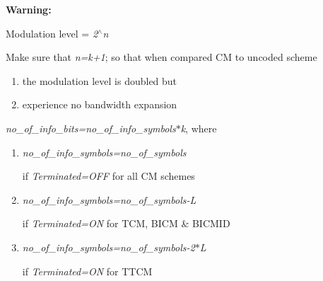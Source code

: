 \begin{Desc}
\item[{\bf Warning: }]\par
\begin{CompactItemize}
\item 
Modulation level = {\em 2$^\wedge$n}\item 
Make sure that {\em n=k+1}; so that when compared CM to uncoded scheme\begin{enumerate}
\item 
the modulation level is doubled but \item 
experience no bandwidth expansion\end{enumerate}
\item 
{\em no\_\-of\_\-info\_\-bits=no\_\-of\_\-info\_\-symbols$\ast$k}, where\begin{enumerate}
\item 
{\em no\_\-of\_\-info\_\-symbols=no\_\-of\_\-symbols} \par
 if {\em Terminated=OFF} for all CM schemes\item 
{\em no\_\-of\_\-info\_\-symbols=no\_\-of\_\-symbols-L} \par
 if {\em Terminated=ON} for TCM, BICM \& BICMID\item 
{\em no\_\-of\_\-info\_\-symbols=no\_\-of\_\-symbols-2$\ast$L} \par
 if {\em Terminated=ON} for TTCM\end{enumerate}
\end{CompactItemize}
\end{Desc}
